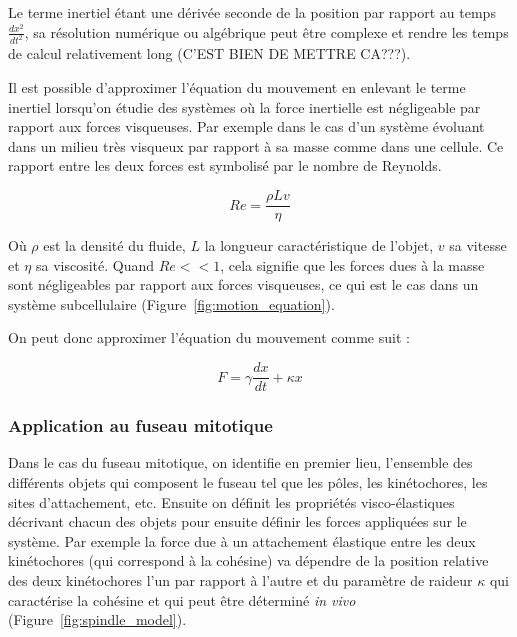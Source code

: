 \documentclass[12pt,a4paper,twoside,openright]{book}
\begin{document}
Le terme inertiel étant une dérivée seconde de la position par rapport
au temps \(\frac{dx^2}{dt^2}\), sa résolution numérique ou algébrique
peut être complexe et rendre les temps de calcul relativement long
(C'EST BIEN DE METTRE CA???).

Il est possible d'approximer l'équation du mouvement en enlevant le
terme inertiel lorsqu'on étudie des systèmes où la force inertielle est
négligeable par rapport aux forces visqueuses. Par exemple dans le cas
d'un système évoluant dans un milieu très visqueux par rapport à sa
masse comme dans une cellule. Ce rapport entre les deux forces est
symbolisé par le nombre de Reynolds.

\[
Re = \frac{\rho Lv}{\eta}
\]

Où \(\rho\) est la densité du fluide, \(L\) la longueur caractéristique
de l'objet, \(v\) sa vitesse et \(\eta\) sa viscosité. Quand
\(Re << 1\), cela signifie que les forces dues à la masse sont
négligeables par rapport aux forces visqueuses, ce qui est le cas dans
un système subcellulaire (Figure~\ref{fig:motion_equation}).

On peut donc approximer l'équation du mouvement comme suit :

\[
F = \gamma\frac{dx}{dt} + \kappa x
\]

\subsubsection{Application au fuseau
mitotique}\label{application-au-fuseau-mitotique}

Dans le cas du fuseau mitotique, on identifie en premier lieu,
l'ensemble des différents objets qui composent le fuseau tel que les
pôles, les kinétochores, les sites d'attachement, etc. Ensuite on
définit les propriétés visco-élastiques décrivant chacun des objets pour
ensuite définir les forces appliquées sur le système. Par exemple la
force due à un attachement élastique entre les deux kinétochores (qui
correspond à la cohésine) va dépendre de la position relative des deux
kinétochores l'un par rapport à l'autre et du paramètre de raideur
\(\kappa\) qui caractérise la cohésine et qui peut être déterminé
\emph{in vivo} (Figure~\ref{fig:spindle_model}).
\end{document}
